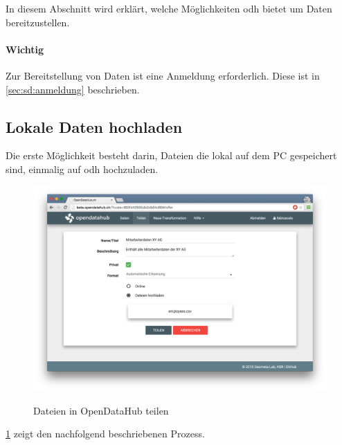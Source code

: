 In diesem Abschnitt wird erklärt, welche Möglichkeiten \acl{odh} bietet um Daten bereitzustellen.

\paragraph{Wichtig} Zur Bereitstellung von Daten ist eine Anmeldung erforderlich. Diese ist in \vref{sec:sd:anmeldung} beschrieben.

\subsection{Lokale Daten hochladen}
\label{sec:sd:teilen-datei}
Die erste Möglichkeit besteht darin, Dateien die lokal auf dem PC gespeichert sind, einmalig auf \acl{odh} hochzuladen.

\begin{figure}[H]
	\centering
	\includegraphics[width=\linewidth]{fig/screenshot-teilen-datei}
	\label{fig:sd:screenshot-teilen-datei}
	\caption{Dateien in OpenDataHub teilen}
\end{figure}


\cref{fig:sd:screenshot-teilen-datei} zeigt den nachfolgend beschriebenen Prozess.


